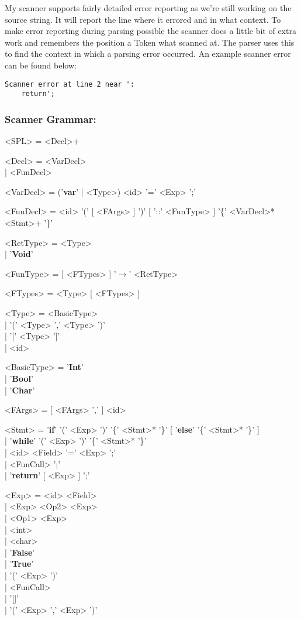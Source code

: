 \documentclass{article}
\begin{document}
My scanner supports fairly detailed error reporting as we're still working on the source string. It will report the line where it errored and in what context. To make error reporting during parsing possible the scanner does a little bit of extra work and remembers the position a Token what scanned at. The parser uses this to find the context in which a parsing error occurred. An example scanner error can be found below:
\begin{lstlisting}[style=boxed]
Scanner error at line 2 near ':
	return';
\end{lstlisting}

\subsubsection*{Scanner Grammar:}
\begin{grammar}
	<SPL> = <Decl>+

	<Decl> = <VarDecl> \\| <FunDecl>

	<VarDecl> = ('\textbf{var}' | <Type>) <id> '=' <Exp> ';'

	<FunDecl> = <id> '(' [ <FArgs> ] ')' [ '::' <FunType> ] '\{' <VarDecl>* <Stmt>+ '\}'

	<RetType> = <Type> \\| '\textbf{Void}'

	<FunType> = [ <FTypes> ] '$\rightarrow$' <RetType>

	<FTypes> = <Type> [ <FTypes> ]

	<Type> = <BasicType> \\| '(' <Type> ',' <Type> ')' \\| '[' <Type> ']' \\| <id>

	<BasicType> = '\textbf{Int}' \\| '\textbf{Bool}' \\| '\textbf{Char}'

	<FArgs> = [ <FArgs> ',' ] <id>

	<Stmt> = '\textbf{if}' '(' <Exp> ')' '\{' <Stmt>* '\}' [ '\textbf{else}' '\{' <Stmt>* '\}' ] \\| '\textbf{while}' '(' <Exp> ')' '\{' <Stmt>* '\}' \\| <id> <Field> '=' <Exp> ';' \\| <FunCall> ';' \\| '\textbf{return}' [ <Exp> ] ';'

	<Exp> = <id> <Field> \\| <Exp> <Op2> <Exp> \\| <Op1> <Exp> \\| <int> \\| <char> \\| '\textbf{False}' \\| '\textbf{True}' \\| '(' <Exp> ')' \\| <FunCall> \\| '[]' \\| '(' <Exp> ',' <Exp> ')'


\end{grammar}
\end{document}
